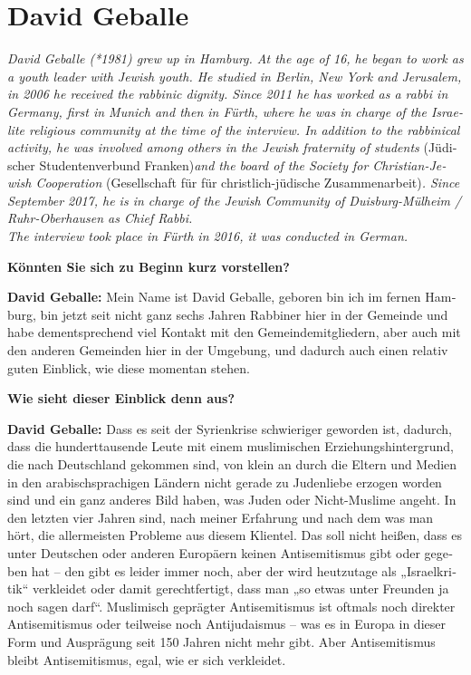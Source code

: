 \section{David Geballe} 
\begin{otherlanguage}{ngerman}
\textit{David Geballe (*1981) grew up in Hamburg. At the age of 16, he began to work as a youth leader with Jewish youth. He studied in Berlin, New York and Jerusalem, in 2006 he received the rabbinic dignity. Since 2011 he has worked as a rabbi in Germany, first in Munich and then in Fürth, where he was in charge of the Israelite religious community at the time of the interview. In addition to the rabbinical activity, he was involved among others in the Jewish fraternity of students }(Jüdischer Studentenverbund Franken)\textit{and the board of the Society for Christian-Jewish Cooperation }(Gesellschaft für für christlich-jüdische Zusammenarbeit)\textit{. Since September 2017, he is in charge of the Jewish Community of Duisburg-Mülheim / Ruhr-Oberhausen as Chief Rabbi.\\
The interview took place in Fürth in 2016, it was conducted in German.}\par
\vspace*{2em}
\textbf{Könnten Sie sich zu Beginn kurz vorstellen?} 

\textbf{David Geballe:} Mein Name ist David Geballe, geboren bin ich im fernen Hamburg, bin jetzt seit nicht ganz sechs Jahren Rabbiner hier in der Gemeinde und habe dementsprechend viel Kontakt mit den Gemeindemitgliedern, aber auch mit den anderen Gemeinden hier in der Umgebung, und dadurch auch einen relativ guten Einblick, wie diese momentan stehen. 

\textbf{Wie sieht dieser Einblick denn aus?} 

\textbf{David Geballe:} Dass es seit der Syrienkrise schwieriger geworden ist, dadurch, dass die hunderttausende Leute mit einem muslimischen Erziehungshintergrund, die nach Deutschland gekommen sind, von klein an durch die Eltern und Medien in den arabischsprachigen Ländern nicht gerade zu Judenliebe erzogen worden sind und ein ganz anderes Bild haben, was Juden oder Nicht-Muslime angeht. In den letzten vier Jahren sind, nach meiner Erfahrung und nach dem was man hört, die allermeisten Probleme aus diesem Klientel. Das soll nicht heißen, dass es unter Deutschen oder anderen Europäern keinen Antisemitismus gibt oder gegeben hat – den gibt es leider immer noch, aber der wird heutzutage als „Israelkritik“ verkleidet oder damit gerechtfertigt, dass man „so etwas unter Freunden ja noch sagen darf“. Muslimisch geprägter Antisemitismus ist oftmals noch direkter Antisemitismus oder teilweise noch Antijudaismus – was es in Europa in dieser Form und Ausprägung seit 150 Jahren nicht mehr gibt. Aber Antisemitismus bleibt Antisemitismus, egal, wie er sich verkleidet. 


\end{otherlanguage}
